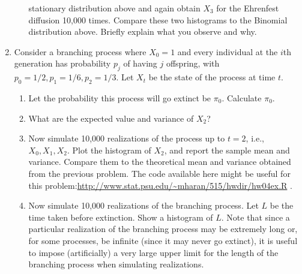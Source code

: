 \documentclass{article}
\begin{document}
\begin{enumerate}
\begin{enumerate}
  stationary distribution above and again obtain $X_3$ for the
  Ehrenfest diffusion 10,000 times. Compare these two histograms to
  the Binomial distribution above. Briefly explain what you observe
  and why. 
\end{enumerate}
\item Consider a branching process where $X_0=1$ and every individual at the $i$th generation has probability $p_j$ of having $j$ offspring, with $p_0=1/2,p_1=1/6, p_2=1/3$. Let $X_t$ be the state of the process at time $t$.
\begin{enumerate}
\item Let the probability this process will go extinct be $\pi_0$. Calculate $\pi_0$.
\item What are the expected value and variance of $X_2$?
\item Now simulate 10,000 realizations of the process up to $t=2$, i.e., $X_0,X_1,X_2$. Plot the histogram of $X_2$, and report the sample mean and variance. Compare them to the theoretical mean and variance obtained from the previous problem. The code available here might be useful for this problem:\url{http://www.stat.psu.edu/~mharan/515/hwdir/hw04ex.R} .
\item Now simulate 10,000 realizations of the branching process. Let
  $L$ be the time taken before extinction. Show a histogram of
  $L$. Note that since a particular realization of the branching
  process may be extremely long or, for some processes, be infinite
  (since it may never go extinct), it is useful to impose
  (artificially) a very large upper limit for the length of the branching process when simulating realizations. 
\end{enumerate}


\end{enumerate}
\end{document}
